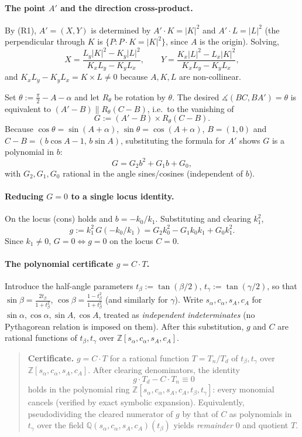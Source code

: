 \documentclass[11pt]{article}
\newcommand{\dangle}{\measuredangle}
\newcommand{\Rtheta}{R_{\theta}}
\theoremstyle{plain}\newtheorem{lemma}{Lemma}
\theoremstyle{remark}\newtheorem*{rmk}{Remark}
\begin{document}
\paragraph{The point $A'$ and the direction cross-product.}
By (R1), $A'=(X,Y)$ is determined by $A'\cdot K=|K|^2$ and $A'\cdot L=|L|^2$
(the perpendicular through $K$ is $\{P:P\cdot K=|K|^2\}$, since $A$ is the
origin). Solving,
\[
  X=\frac{L_y|K|^2-K_y|L|^2}{K_xL_y-K_yL_x},\qquad
  Y=\frac{K_x|L|^2-L_x|K|^2}{K_xL_y-K_yL_x},
\]
and $K_xL_y-K_yL_x=K\times L\neq0$ because $A,K,L$ are non-collinear.

Set $\theta:=\tfrac{\pi}{2}-A-\alpha$ and let $\Rtheta$ be rotation by $\theta$.
The desired $\dangle(BC,BA')=\theta$ is equivalent to $(A'-B)\parallel\Rtheta(C-B)$,
i.e.\ to the vanishing of
\[
  G:=(A'-B)\times\Rtheta(C-B). \tag{G}
\]
Because $\cos\theta=\sin(A+\alpha)$, $\sin\theta=\cos(A+\alpha)$, $B=(1,0)$ and
$C-B=(b\cos A-1,\,b\sin A)$, substituting the formula for $A'$ shows $G$ is a
polynomial in $b$:
\[
  G=G_2 b^2+G_1 b+G_0, \tag{Gquad}
\]
with $G_2,G_1,G_0$ rational in the angle sines/cosines (independent of $b$).

\paragraph{Reducing $G=0$ to a single locus identity.}
On the locus (cons) holds and $b=-k_0/k_1$. Substituting and clearing
$k_1^2$,
\[
  g:=k_1^{2}\,G(-k_0/k_1)=G_2 k_0^2-G_1 k_0 k_1+G_0 k_1^2. \tag{g}
\]
Since $k_1\neq0$, $G=0\iff g=0$ on the locus $C=0$.

\paragraph{The polynomial certificate $g=C\cdot T$.}
Introduce the half-angle parameters $t_\beta:=\tan(\beta/2)$,
$t_\gamma:=\tan(\gamma/2)$, so that $\sin\beta=\tfrac{2t_\beta}{1+t_\beta^2}$,
$\cos\beta=\tfrac{1-t_\beta^2}{1+t_\beta^2}$ (and similarly for $\gamma$). Write
$s_\alpha,c_\alpha,s_A,c_A$ for $\sin\alpha,\cos\alpha,\sin A,\cos A$, treated
as \emph{independent indeterminates} (no Pythagorean relation is imposed on
them). After this substitution, $g$ and $C$ are rational functions of
$t_\beta,t_\gamma$ over $\mathbb{Z}[s_\alpha,c_\alpha,s_A,c_A]$.

\begin{quote}
\textbf{Certificate.} $g=C\cdot T$ for a rational function
$T=T_n/T_d$ of $t_\beta,t_\gamma$ over $\mathbb{Z}[s_\alpha,c_\alpha,s_A,c_A]$.
After clearing denominators, the identity
\[
  g\cdot T_d-C\cdot T_n\equiv 0
\]
holds in the polynomial ring $\mathbb{Z}[s_\alpha,c_\alpha,s_A,c_A,t_\beta,t_\gamma]$:
every monomial cancels (verified by exact symbolic expansion). Equivalently,
pseudodividing the cleared numerator of $g$ by that of $C$ as polynomials in
$t_\gamma$ over the field $\mathbb{Q}(s_\alpha,c_\alpha,s_A,c_A)(t_\beta)$ yields
\emph{remainder $0$} and quotient $T$.
\end{quote}
\end{document}
